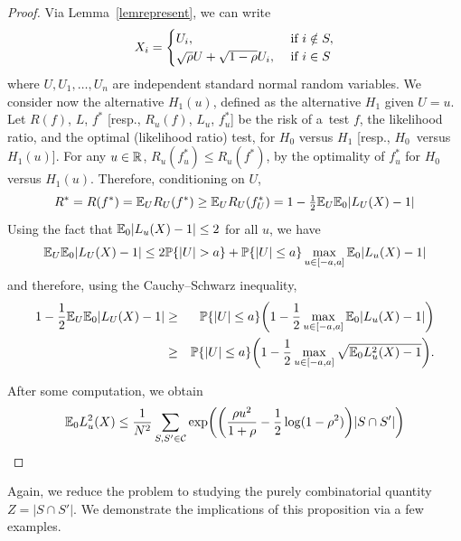 \documentclass[10pt, oneside]{article}
\begin{document}
\begin{proof}
  Via Lemma~\ref{lemrepresent}, we can write 
    \[
    X_i = \begin{cases}
    U_i, \quad & \mbox{ if } i \notin S, \cr
    \sqrt{\rho}  U + \sqrt{1-\rho}  U_i, & \mbox{ if } i \in S
    \end{cases}
    \]
  where $U,U_1,\ldots,U_n$ are independent standard normal random variables.
  We consider now the alternative $H_1(u)$, defined as the alternative
$H_1$ given \mbox{$U=u$}.
Let $R(f)$, $L$, $f^*$ [resp., $R_u(f)$, $L_u$, $f_u^*$] be the risk of
a~test $f$, the likelihood ratio, and the optimal (likelihood ratio)
test, for $H_0$ versus $H_1$ [resp., $H_0$~versus $H_1(u)$]. For any $u
\in{\mathbb R}$, $R_u(f_u^*) \leq R_u(f^*)$, by the optimality of $f_u^*$
for $H_0$ versus $H_1(u)$. Therefore, conditioning on $U$,
$$R^* = R(f^*) = \mathbb{E}_{U} R_U(f^*) \geq \mathbb{E}_{U} R_U(f_U^*) = 1 - \tfrac{1}{2} \mathbb{E}_{U} \mathbb{E}_0 |L_U(X) - 1|$$
Using the fact that
$\mathbb{E}_0 |L_u(X) - 1| \le2$ for all $u$, we have
%
\[
\bE_{U} \bE_0 |L_U(X) - 1|
\le2\bP\{|U|>a\} + \bP\{|U|\le a\} \max_{u \in[-a,a]} \bE_0
|L_u(X) - 1|
\]
%
and therefore, using the Cauchy--Schwarz inequality,
%
\begin{eqnarray*}
1 - \frac{1}{2} \mathbb{E}_{U} \mathbb{E}_0 |L_U(X) - 1|
& \ge&
\mathbb{P}\{|U|\le a\}\biggl( 1-\frac{1}{2}\max_{u \in[-a,a]} \mathbb{E}_0
|L_u(X) - 1|\biggr)
\\
& \geq& \mathbb{P}\{|U|\le a\}\biggl(1 - \frac12 \max_{u \in[-a,a]}
\sqrt{\mathbb{E}_0 L_u^2(X) - 1}\biggr).
\end{eqnarray*}

After some computation, we obtain 
$$\mathbb{E}_0 L_u^2(X) \le \frac{1}{N^2} \sum_{S, S' \in{\mathcal C}}
\exp\biggl(\biggl(\frac{\rho u^2}{1+\rho}- \frac12\log(1-\rho
^2)\biggr) |S \cap S'| \biggr)$$
\end{proof}

Again, we reduce the problem to studying the purely combinatorial quantity $Z = |S \cap S'|$. We demonstrate the implications of this proposition via a few examples.
\end{document}
